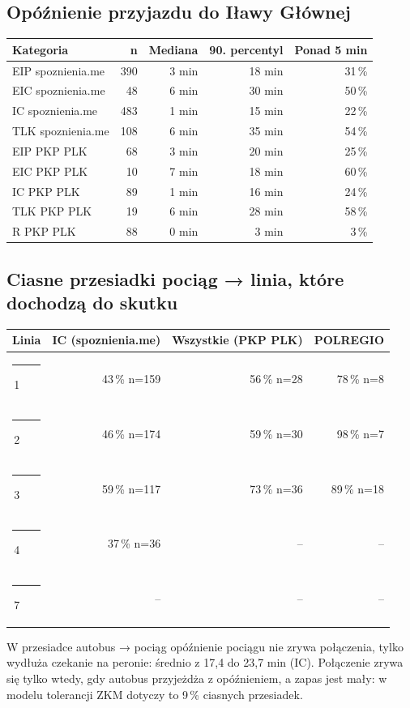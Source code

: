 \documentclass[10pt,a4paper]{article}
\newcommand{\linedot}[1]{\textcolor{#1}{\rule[0.1ex]{0.9ex}{0.9ex}}\,}
\newcommand{\mut}[1]{\textcolor{muted}{#1}}
\begin{document}
\subsection*{Opóźnienie przyjazdu do Iławy Głównej}
{\small
\begin{center}\begin{tabular}{@{}l r r r r@{}}\toprule
Kategoria & n & Mediana & 90. percentyl & Ponad 5 min \\ \midrule
EIP \mut{spoznienia.me} & 390 & 3 min & 18 min & 31\,\% \\
EIC \mut{spoznienia.me} & 48 & 6 min & 30 min & 50\,\% \\
IC \mut{spoznienia.me} & 483 & 1 min & 15 min & 22\,\% \\
TLK \mut{spoznienia.me} & 108 & 6 min & 35 min & 54\,\% \\
EIP \mut{PKP PLK} & 68 & 3 min & 20 min & 25\,\% \\
EIC \mut{PKP PLK} & 10 & 7 min & 18 min & 60\,\% \\
IC \mut{PKP PLK} & 89 & 1 min & 16 min & 24\,\% \\
TLK \mut{PKP PLK} & 19 & 6 min & 28 min & 58\,\% \\
R \mut{PKP PLK} & 88 & 0 min & 3 min & 3\,\% \\
\bottomrule\end{tabular}\end{center}}
\subsection*{Ciasne przesiadki pociąg → linia, które dochodzą do skutku}
{\small
\begin{center}\begin{tabular}{@{}l r r r@{}}\toprule
Linia & IC (spoznienia.me) & Wszystkie (PKP PLK) & POLREGIO \\ \midrule
\linedot{L1}1 & 43\,\% \mut{n=159} & 56\,\% \mut{n=28} & 78\,\% \mut{n=8} \\
\linedot{L2}2 & 46\,\% \mut{n=174} & 59\,\% \mut{n=30} & 98\,\% \mut{n=7} \\
\linedot{L3}3 & 59\,\% \mut{n=117} & 73\,\% \mut{n=36} & 89\,\% \mut{n=18} \\
\linedot{L4}4 & 37\,\% \mut{n=36} & -- & -- \\
\linedot{L7}7 & -- & -- & -- \\
\bottomrule\end{tabular}\end{center}}
W przesiadce autobus → pociąg opóźnienie pociągu nie zrywa połączenia, tylko wydłuża czekanie na peronie: średnio z 17,4 do 23,7 min (IC). Połączenie zrywa się tylko wtedy, gdy autobus przyjeżdża z opóźnieniem, a zapas jest mały: w modelu tolerancji ZKM dotyczy to 9\,\% ciasnych przesiadek.
\end{document}
